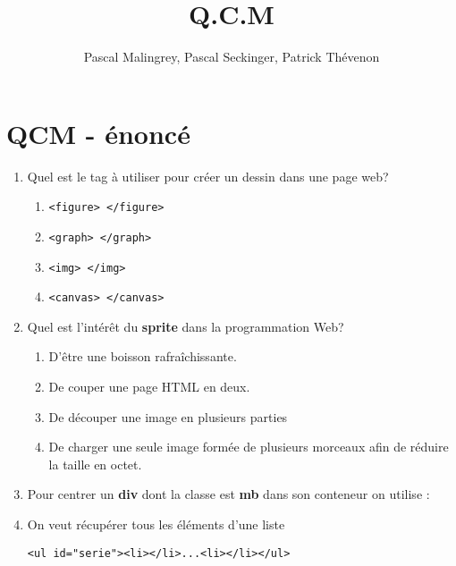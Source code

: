 \documentclass[]{scrartcl}
\title{Q.C.M}
\author{ Pascal Malingrey, Pascal Seckinger, Patrick Th\'evenon}
\date{}
\begin{document}
\maketitle

\newpage

\section*{QCM - énoncé}
\begin{enumerate}
    \item Quel est le tag à utiliser pour créer un dessin dans une page web?
    \begin{enumerate}
      \item \verb?<figure> </figure>?
      \item \verb?<graph> </graph>?
      \item \verb?<img> </img>?
      \item \verb?<canvas> </canvas>?
    \end{enumerate}
    \item Quel est l'intérêt du \textbf{sprite} dans la programmation Web?
    \begin{enumerate}
      \item D'être une boisson rafraîchissante.
      \item De couper une page HTML en deux.
      \item De découper une image en plusieurs parties
      \item De charger une seule image formée de plusieurs morceaux afin de réduire la taille en octet.
    \end{enumerate}
    \item Pour centrer un \textbf{div} dont la classe est \textbf{mb} dans son conteneur on utilise :
    \item On veut récupérer tous les éléments d'une liste
    
    \texttt{<ul id="serie"><li></li>...<li></li></ul>}
    

\end{enumerate}
\end{document}
